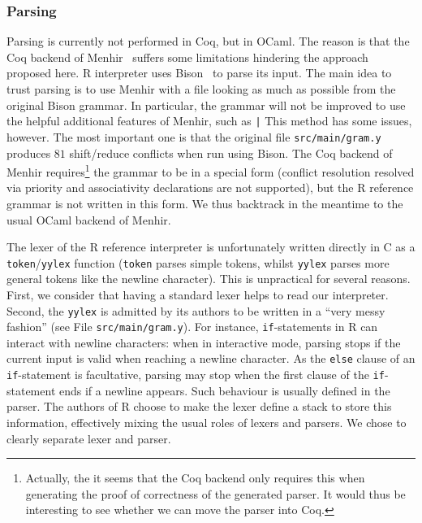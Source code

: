 \documentclass{article}
\newcommand\Coq{Coq}
\newcommand\OCaml{OCaml}
\newcommand\R{R}
\newcommand\Cn{C}
\begin{document}
\subsubsection{Parsing}
\label{sec:parsing}

Parsing is currently not performed in \Coq{}, but in \OCaml{}.
The reason is that the \Coq{} backend of Menhir~\parencite{jourdan2012validating}
suffers some limitations hindering the approach proposed here.
\R{} interpreter uses Bison~\parencite{Bison} to parse its input.
The main idea to trust parsing
is to use Menhir with a file looking as much as possible
from the original Bison grammar.
In particular, the grammar will not be improved to use the helpful
additional features of Menhir,
such as \texttt|%
This method has some issues, however.
The most important one is that the original file \texttt{src/main/gram.y}
produces \(81\) shift/reduce conflicts when run using Bison.
%
The \Coq{} backend of Menhir requires\footnote{
    Actually, the it seems that the \Coq{} backend only requires
    this when generating the proof of correctness of the generated parser.
    It would thus be interesting to see whether we can move the parser
    into \Coq{}.
} the grammar to be in a special form
(conflict resolution resolved via priority and associativity declarations
are not supported),
but the \R{} reference grammar is not written in this form.
We thus backtrack in the meantime to the usual \OCaml{} backend of Menhir.

The lexer of the \R{} reference interpreter is unfortunately
written directly in \Cn{} as a \texttt{token}/\texttt{yylex} function
(\texttt{token} parses simple tokens,
whilst \texttt{yylex} parses more general tokens
like the newline character).
This is unpractical for several reasons.
First, we consider that having a standard lexer helps to read our interpreter.
Second, the \texttt{yylex} is admitted by its authors
to be written in a “very messy fashion”
(see File \texttt{src/main/gram.y}).
For instance, \texttt{if}-statements in \R{} can interact with
newline characters:
when in interactive mode, parsing stops if the current input is valid
when reaching a newline character.
As the \texttt{else} clause of an \texttt{if}-statement
is facultative,
parsing may stop when the first clause of the \texttt{if}-statement
ends if a newline appears.
Such behaviour is usually defined in the parser.
The authors of \R{} choose to make the lexer define a stack
to store this information,
effectively mixing the usual roles of lexers and parsers.
We chose to clearly separate lexer and parser.
\end{document}
